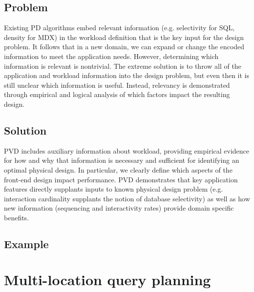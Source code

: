 \subsection{Problem}


Existing PD algorithms embed relevant information (e.g. selectivity for SQL, density for MDX) in the workload definition that is the key input for the design problem. It follows that in a new domain, we can expand or change the encoded information to meet the application needs. However, determining which information is relevant is nontrivial. The extreme solution is to throw all of the application and workload information into the design problem, but even then it is still unclear which information is useful. Instead, relevancy is demonstrated through empirical and logical analysis of which factors impact the resulting design. 

\subsection{Solution} PVD includes auxiliary information about workload, providing empirical evidence for how and why that information is necessary and sufficient for identifying an optimal physical design. In particular, we clearly define which aspects of the front-end design impact performance. PVD demonstrates that key application features directly supplants inputs to known physical design problem (e.g. interaction cardinality supplants the notion of database selectivity) as well as how new information (sequencing and interactivity rates) provide domain specific benefits. 
\subsection{Example}

\section{Multi-location query planning}
